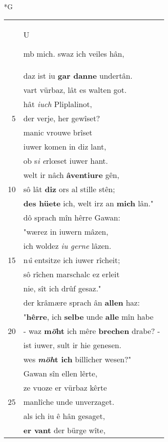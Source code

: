 \documentclass[8pt,a4paper,notitlepage]{article}
\begin{document}
\begin{table}[ht]
\begin{minipage}[t]{0.5\linewidth}
\small
\begin{center}*G
\end{center}
\begin{tabular}{rl}
 & \begin{large}U\end{large}mb mich. swaz ich veiles hân,\\ 
 & daz ist iu \textbf{gar danne} undertân.\\ 
 & vart vürbaz, lât es walten got.\\ 
 & hât \textit{iuch} Pliplalinot,\\ 
5 & der verje, her gewîset?\\ 
 & manic vrouwe brîset\\ 
 & iuwer komen in diz lant,\\ 
 & ob s\textit{i} \textit{e}rlœset iuwer hant.\\ 
 & welt ir nâch \textbf{âventiure} gên,\\ 
10 & sô lât \textbf{diz} ors al stille stên;\\ 
 & \textbf{des hüete} ich, welt irz an \textbf{mich} lân."\\ 
 & dô sprach mîn hêrre Gawan:\\ 
 & "wærez in iuwern mâzen,\\ 
 & ich woldez \textit{iu gerne} lâzen.\\ 
15 & n\textit{û} entsitze ich iuwer rîcheit;\\ 
 & sô rîchen marschalc ez erleit\\ 
 & nie, sît ich drûf gesaz."\\ 
 & der krâmære sprach ân \textbf{allen} haz:\\ 
 & "\textbf{hêrre}, ich \textbf{selbe} unde \textbf{alle} mîn habe\\ 
20 & - waz \textbf{m\textit{ö}ht} ich mêre \textbf{brechen} drabe? -\\ 
 & ist iuwer, sult ir hie genesen.\\ 
 & wes \textbf{\textit{möh}t ich} billîcher wesen?"\\ 
 & Gawan sîn ellen lêrte,\\ 
 & ze vuoze er vürbaz kêrte\\ 
25 & manlîche unde unverzaget.\\ 
 & als ich iu ê hân gesaget,\\ 
 & \textbf{er vant} der bürge wîte,\\ 

\end{tabular}
\end{minipage}
\end{table}
\end{document}
